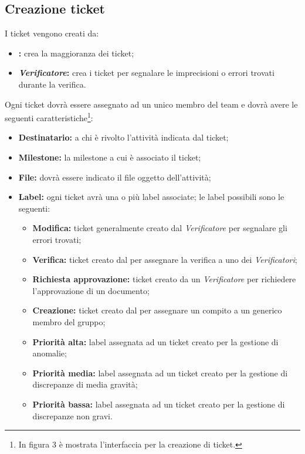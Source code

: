 \subsection{Creazione ticket}
\label{cticket}
I ticket vengono creati da:
\begin{itemize}
\item \textbf{\projectManager:} crea la maggioranza dei ticket;
\item \textbf{\emph{Verificatore}:} crea i ticket per segnalare le imprecisioni o errori trovati durante la verifica.
\end{itemize}
Ogni ticket dovrà essere assegnato ad un unico membro del team \authorName{} e dovrà avere le seguenti caratteristiche\footnote{In figura 3 è mostrata l'interfaccia per la creazione di ticket.}:
\begin{itemize}
\item{\textbf{Destinatario:}} a chi è rivolto l'attività indicata dal ticket;
\item{\textbf{Milestone:}} la milestone\glossario{} a cui è associato il ticket;
\item{\textbf{File:}} dovrà essere indicato il file oggetto dell'attività;
\item{\textbf{Label:}} ogni ticket avrà una o più label associate; le label possibili sono le seguenti:
\begin{itemize}
\item\textbf{Modifica:} ticket generalmente creato dal \emph{Verificatore} per segnalare gli errori trovati;
\item\textbf{Verifica:} ticket creato dal \projectManager{} per assegnare la verifica a uno dei \emph{Verificatori};
\item\textbf{Richiesta approvazione:} ticket creato da un \emph{Verificatore} per richiedere l'approvazione di un documento;
\item\textbf{Creazione:} ticket creato dal \projectManager{} per assegnare un compito a un generico membro del gruppo;
\item\textbf{Priorità alta:} label assegnata ad un ticket creato per la gestione di anomalie;
\item\textbf{Priorità media:} label assegnata ad un ticket creato per la gestione di discrepanze di media gravità;
\item\textbf{Priorità bassa:} label assegnata ad un ticket creato per la gestione di discrepanze non gravi.
\end{itemize}
\end{itemize}

